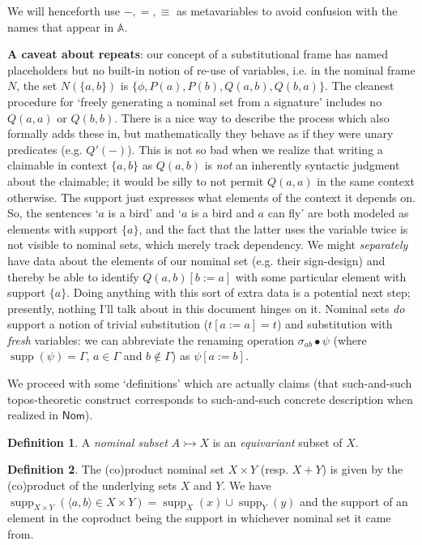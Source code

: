 \documentclass{article}
\theoremstyle{definition}
\newtheorem{definition}{Definition}[section]
\newcommand{\A}{\mathbb{A}}
\newcommand{\cat}[1]{\mathsf{#1}}
\newcommand{\supp}{\operatorname{supp}}
\begin{document}
We will henceforth use $-,=,\equiv$ as metavariables to avoid confusion with the names that appear in $\A$. 


{\bf A caveat about repeats}: our concept of a substitutional frame has named placeholders but no built-in notion of re-use of variables, i.e. in the nominal frame $N$, the set $N(\{a,b\})$ is $\{\phi, P(a), P(b),Q(a,b),Q(b,a)\}$. The cleanest procedure for `freely generating a nominal set from a signature' includes no $Q(a,a)$ or $Q(b,b)$. 
There is a nice way to describe the process which also formally adds these in, but mathematically they behave as if they were unary predicates (e.g. $Q'(-)$).
This is not so bad when we realize that writing a claimable in context $\{a,b\}$ as $Q(a,b)$ is {\it not} an inherently syntactic judgment about the claimable; it would be silly to not permit $Q(a,a)$ in the same context otherwise. The support just expresses  what elements of the context it depends on. 
So, the sentences `$a$ is a bird' and `$a$ is a bird and $a$ can fly' are both modeled as elements with support $\{a\}$, and the fact that the latter uses the variable twice is not visible to nominal sets, which merely track dependency.
We might {\it separately} have data about the elements of our nominal set (e.g. their sign-design) and thereby be able to identify $Q(a,b)[b:=a]$ with some particular element with support $\{a\}$. 
Doing anything with this sort of extra data is a potential next step; presently, nothing I'll talk about in this document hinges on it. 
Nominal sets {\it do} support a notion of trivial substitution ($t[a:=a]=t$) and substitution with {\it fresh} variables: we can abbreviate the renaming operation $\sigma_{ab}\bullet \psi$ (where $\supp(\psi)=\Gamma$, $a\in \Gamma$ and $b\notin \Gamma$) as $\psi[a:=b]$.


We proceed with some `definitions' which are actually claims (that such-and-such topos-theoretic construct corresponds to such-and-such concrete description when realized in $\cat{Nom}$).

\begin{definition}
    \label{def:nomsubset}
    A {\it nominal subset} $A \rightarrowtail X$ is an {\it equivariant} subset of $X$.  
\end{definition}

\begin{definition}
    \label{def:nomprod}
    The (co)product nominal set $X\times Y$ (resp. $X+Y$) is given by the (co)product of the underlying sets $X$ and $Y$. We have $\supp_{X\times Y}(\langle a,b\rangle\in X\times Y) = \supp_X(x)\cup \supp_Y(y)$ and the support of an element in the coproduct being the support in whichever nominal set it came from.  
\end{definition}
\end{document}
